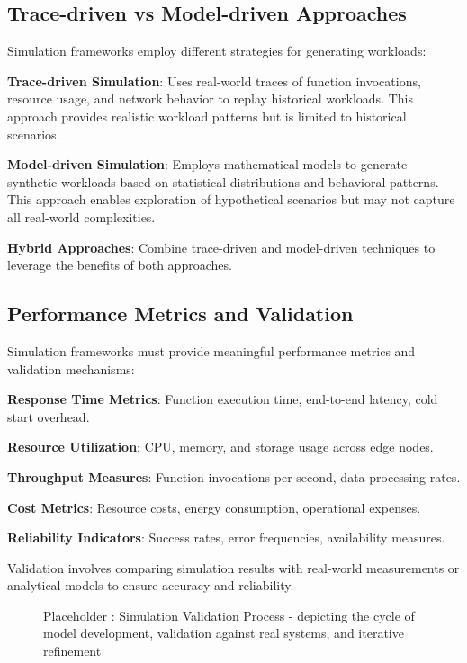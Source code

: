 \subsection{Trace-driven vs Model-driven Approaches}

Simulation frameworks employ different strategies for generating workloads:

\textbf{Trace-driven Simulation}: Uses real-world traces of function invocations, resource usage, and network behavior to replay historical workloads. This approach provides realistic workload patterns but is limited to historical scenarios.

\textbf{Model-driven Simulation}: Employs mathematical models to generate synthetic workloads based on statistical distributions and behavioral patterns. This approach enables exploration of hypothetical scenarios but may not capture all real-world complexities.

\textbf{Hybrid Approaches}: Combine trace-driven and model-driven techniques to leverage the benefits of both approaches.

\subsection{Performance Metrics and Validation}

Simulation frameworks must provide meaningful performance metrics and validation mechanisms:

\textbf{Response Time Metrics}: Function execution time, end-to-end latency, cold start overhead.

\textbf{Resource Utilization}: CPU, memory, and storage usage across edge nodes.

\textbf{Throughput Measures}: Function invocations per second, data processing rates.

\textbf{Cost Metrics}: Resource costs, energy consumption, operational expenses.

\textbf{Reliability Indicators}: Success rates, error frequencies, availability measures.

Validation involves comparing simulation results with real-world measurements or analytical models to ensure accuracy and reliability.

\begin{figure}[h]
    \centering
    \caption{Placeholder : Simulation Validation Process - depicting the cycle of model development, validation against real systems, and iterative refinement}
    \label{fig:simulation_validation}
\end{figure}


